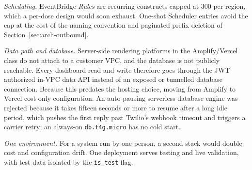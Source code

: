 \emph{Scheduling.} EventBridge \emph{Rules} are recurring constructs capped at
300 per region, which a per-dose design would soon exhaust. One-shot Scheduler
entries avoid the cap at the cost of the naming convention
and paginated prefix deletion of Section~\ref{sec:arch-outbound}.

\emph{Data path and database.} Server-side rendering platforms in the
Amplify/Vercel class do not attach to a customer VPC, and the database is not
publicly reachable. Every dashboard read and write therefore goes through the
JWT-authorized in-VPC data API instead of an exposed or tunnelled database
connection. Because this predates the hosting choice, moving from Amplify to
Vercel cost only configuration. An auto-pausing serverless database engine was
rejected because it takes fifteen seconds or more to resume after a long idle
period, which pushes the first reply past Twilio's webhook timeout and
triggers a carrier retry; an always-on \texttt{db.t4g.micro} has no cold
start.

\emph{One environment.} For a system run by one person, a second stack would
double cost and configuration drift. One deployment serves testing and live
validation, with test data isolated by the \texttt{is\_test} flag.
